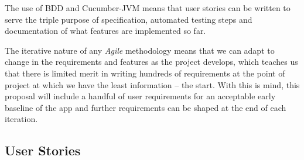 \documentclass{article}
\begin{document}
The use of BDD and Cucumber-JVM means that user stories can be written to
serve the triple purpose of specification, automated testing steps and
documentation of what features are implemented so far.

The iterative
nature of any \emph{Agile} methodology means that we can adapt to change
in the requirements and features as the project develops, which teaches
us that there is limited merit in writing hundreds of requirements at the
point of project at which we have the least information -- the start. With
this is mind, this proposal will include a handful of user requirements for
an acceptable early baseline of the app and further requirements can be
shaped at the end of each iteration.

\subsection{User Stories}







\end{document}
